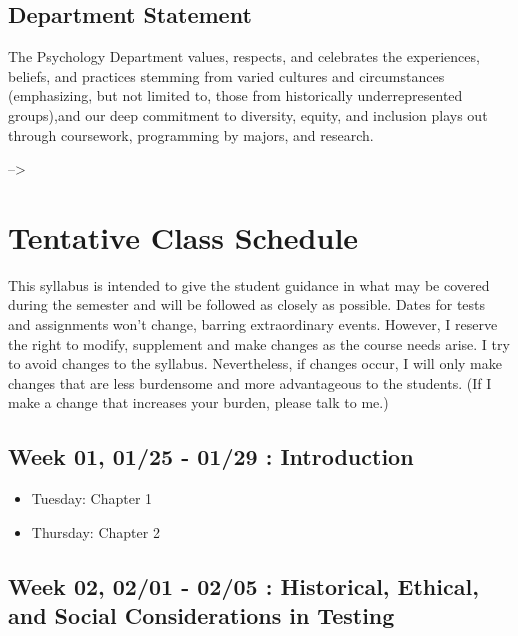 \documentclass[11pt,]{article}
\providecommand{\tightlist}{%
  \setlength{\itemsep}{0pt}\setlength{\parskip}{0pt}}
\begin{document}
\hypertarget{department-statement}{%
\subsection{Department Statement}\label{department-statement}}

The Psychology Department values, respects, and celebrates the
experiences, beliefs, and practices stemming from varied cultures and
circumstances (emphasizing, but not limited to, those from historically
underrepresented groups),and our deep commitment to diversity, equity,
and inclusion plays out through coursework, programming by majors, and
research.

--\textgreater{}

\hypertarget{tentative-class-schedule}{%
\section{Tentative Class Schedule}\label{tentative-class-schedule}}

This syllabus is intended to give the student guidance in what may be
covered during the semester and will be followed as closely as possible.
Dates for tests and assignments won't change, barring extraordinary
events. However, I reserve the right to modify, supplement and make
changes as the course needs arise. I try to avoid changes to the
syllabus. Nevertheless, if changes occur, I will only make changes that
are less burdensome and more advantageous to the students. (If I make a
change that increases your burden, please talk to me.)

\hypertarget{week-01-0125---0129-introduction}{%
\subsection{Week 01, 01/25 - 01/29 :
Introduction}\label{week-01-0125---0129-introduction}}

\begin{itemize}
\tightlist
\item
  Tuesday: Chapter 1
\item
  Thursday: Chapter 2
\end{itemize}

\hypertarget{week-02-0201---0205-historical-ethical-and-social-considerations-in-testing}{%
\subsection{Week 02, 02/01 - 02/05 : Historical, Ethical, and Social
Considerations in
Testing}\label{week-02-0201---0205-historical-ethical-and-social-considerations-in-testing}}
\end{document}
